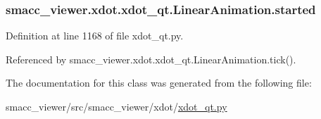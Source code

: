 \subsubsection[{\texorpdfstring{started}{started}}]{\setlength{\rightskip}{0pt plus 5cm}smacc\+\_\+viewer.\+xdot.\+xdot\+\_\+qt.\+Linear\+Animation.\+started}\hypertarget{classsmacc__viewer_1_1xdot_1_1xdot__qt_1_1LinearAnimation_a57bb32b90fafd66526f0908d2dd8fb88}{}\label{classsmacc__viewer_1_1xdot_1_1xdot__qt_1_1LinearAnimation_a57bb32b90fafd66526f0908d2dd8fb88}


Definition at line 1168 of file xdot\+\_\+qt.\+py.



Referenced by smacc\+\_\+viewer.\+xdot.\+xdot\+\_\+qt.\+Linear\+Animation.\+tick().



The documentation for this class was generated from the following file\+:\begin{DoxyCompactItemize}
\item 
smacc\+\_\+viewer/src/smacc\+\_\+viewer/xdot/\hyperlink{xdot__qt_8py}{xdot\+\_\+qt.\+py}\end{DoxyCompactItemize}
